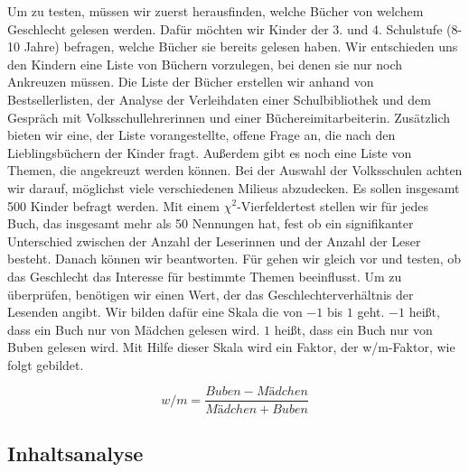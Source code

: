Um  zu testen, müssen wir zuerst herausfinden, welche
Bücher von welchem Geschlecht gelesen werden. Dafür möchten wir Kinder
der 3. und 4. Schulstufe (8-10 Jahre) befragen, welche Bücher sie
bereits gelesen haben. Wir entschieden uns den Kindern eine Liste von
Büchern vorzulegen, bei denen sie nur noch Ankreuzen müssen. Die Liste
der Bücher erstellen wir anhand von Bestsellerlisten, der Analyse der
Verleihdaten einer Schulbibliothek und dem Gespräch mit
Volksschullehrerinnen und einer Büchereimitarbeiterin. Zusätzlich bieten
wir eine, der Liste vorangestellte, offene Frage an, die nach den
Lieblingsbüchern der Kinder fragt. Außerdem gibt es noch eine Liste von
Themen, die angekreuzt werden können. Bei der Auswahl der Volksschulen
achten wir darauf, möglichst viele verschiedenen Milieus abzudecken. Es
sollen insgesamt 500 Kinder befragt werden. Mit einem
$\chi^2$-Vierfeldertest stellen wir für jedes Buch, das insgesamt mehr
als 50 Nennungen hat, fest ob ein signifikanter Unterschied zwischen der
Anzahl der Leserinnen und der Anzahl der Leser besteht. Danach können
wir  beantworten. Für  gehen wir
gleich vor und testen, ob das Geschlecht das Interesse für bestimmte
Themen beeinflusst. Um  zu überprüfen, benötigen wir
einen Wert, der das Geschlechterverhältnis der Lesenden angibt. Wir
bilden dafür eine Skala die von $-1$ bis $1$ geht. $-1$ heißt, dass ein
Buch nur von Mädchen gelesen wird. $1$ heißt, dass ein Buch nur von
Buben gelesen wird. Mit Hilfe dieser Skala wird ein Faktor, der
w/m-Faktor, wie folgt gebildet.

\begin{equation} w/m=\frac{Buben-Mädchen}{Mädchen+Buben} \end{equation}

\subsection{Inhaltsanalyse}

